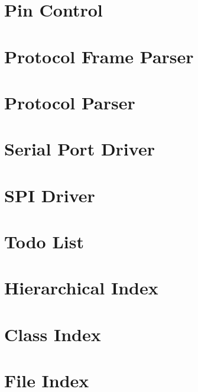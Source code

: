 \documentclass[twoside]{book}
\newcommand{\+}{\discretionary{\mbox{\scriptsize$\hookleftarrow$}}{}{}}
\begin{document}
\chapter{Pin Control}
\label{md_lib_pin_control__r_e_a_d_m_e}

\chapter{Protocol Frame Parser}
\label{md_lib_protocol_frame_parser__r_e_a_d_m_e}

\chapter{Protocol Parser}
\label{md_lib_protocol_parser__r_e_a_d_m_e}

\chapter{Serial Port Driver}
\label{md_lib_serial_port_driver__r_e_a_d_m_e}

\chapter{SPI Driver}
\label{md_lib_spi_driver__r_e_a_d_m_e}

\chapter{Todo List}
\label{todo}

\chapter{Hierarchical Index}

\chapter{Class Index}

\chapter{File Index}

\end{document}
